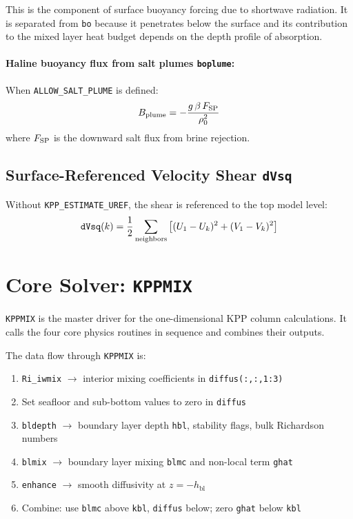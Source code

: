 \documentclass[12pt,letterpaper]{article}
\newcommand{\hbl}{h_{\mathrm{bl}}}
\begin{document}
This is the component of surface buoyancy forcing due to shortwave  
radiation. It is separated from \texttt{bo} because it penetrates  
below the surface and its contribution to the mixed layer heat budget  
depends on the depth profile of absorption.  
  
\paragraph{Haline buoyancy flux from salt plumes \texttt{boplume}:}  
When \texttt{ALLOW\_SALT\_PLUME} is defined:  
\begin{equation}  
B_{\rm plume} = -\frac{g\,\beta\,F_{\rm SP}}{\rho_0^2}  
\end{equation}  
where $F_{\rm SP}$ is the downward salt flux from brine rejection.  
  
\subsection{Surface-Referenced Velocity Shear \texttt{dVsq}}  
  
Without \texttt{KPP\_ESTIMATE\_UREF}, the shear is referenced to the  
top model level:  
\begin{equation}  
\texttt{dVsq}(k) = \frac{1}{2}\sum_{\rm neighbors}  
\left[(U_1 - U_k)^2 + (V_1 - V_k)^2\right]  
\end{equation}  
  
\section{Core Solver: \texttt{KPPMIX}}  
  
\texttt{KPPMIX} is the master driver for the one-dimensional KPP column  
calculations. It calls the four core physics routines in sequence and  
combines their outputs.  
  
The data flow through \texttt{KPPMIX} is:  
  
\begin{enumerate}[leftmargin=*, label=\textbf{\arabic*.}]  
  \item \texttt{Ri\_iwmix} $\rightarrow$ interior mixing coefficients  
        in \texttt{diffus(:,:,1:3)}  
  \item Set seafloor and sub-bottom values to zero in \texttt{diffus}  
  \item \texttt{bldepth} $\rightarrow$ boundary layer depth \texttt{hbl},  
        stability flags, bulk Richardson numbers  
  \item \texttt{blmix} $\rightarrow$ boundary layer mixing \texttt{blmc}  
        and non-local term \texttt{ghat}  
  \item \texttt{enhance} $\rightarrow$ smooth diffusivity at $z = -\hbl$  
  \item Combine: use \texttt{blmc} above \texttt{kbl}, \texttt{diffus}  
        below; zero \texttt{ghat} below \texttt{kbl}  
\end{enumerate}  
  
\end{document}
